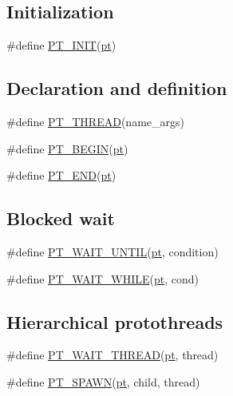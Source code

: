 \subsection*{Initialization}
\begin{DoxyCompactItemize}
\item 
\#define \hyperlink{group__pt_gae6bae7dc0225468c8a5ac269df549892}{P\+T\+\_\+\+I\+N\+I\+T}(\hyperlink{structpt}{pt})
\end{DoxyCompactItemize}
\subsection*{Declaration and definition}
\begin{DoxyCompactItemize}
\item 
\#define \hyperlink{group__pt_ga3d4c8bd4aada659eb34f5d2ffd3e7901}{P\+T\+\_\+\+T\+H\+R\+E\+A\+D}(name\+\_\+args)
\item 
\#define \hyperlink{group__pt_ga2ffbb9e554e08a343ae2f9de4bedfdfc}{P\+T\+\_\+\+B\+E\+G\+I\+N}(\hyperlink{structpt}{pt})
\item 
\#define \hyperlink{group__pt_ga7b04a0035bef29d905496c23bae066d2}{P\+T\+\_\+\+E\+N\+D}(\hyperlink{structpt}{pt})
\end{DoxyCompactItemize}
\subsection*{Blocked wait}
\begin{DoxyCompactItemize}
\item 
\#define \hyperlink{group__pt_ga99e43010ec61327164466aa2d902de45}{P\+T\+\_\+\+W\+A\+I\+T\+\_\+\+U\+N\+T\+I\+L}(\hyperlink{structpt}{pt}, condition)
\item 
\#define \hyperlink{group__pt_gaad14bbbf092b90aa0a5a4f9169504a8d}{P\+T\+\_\+\+W\+A\+I\+T\+\_\+\+W\+H\+I\+L\+E}(\hyperlink{structpt}{pt}, cond)
\end{DoxyCompactItemize}
\subsection*{Hierarchical protothreads}
\begin{DoxyCompactItemize}
\item 
\#define \hyperlink{group__pt_ga2f8f70c30b9ee08a103fbd69a4365c4c}{P\+T\+\_\+\+W\+A\+I\+T\+\_\+\+T\+H\+R\+E\+A\+D}(\hyperlink{structpt}{pt}, thread)
\item 
\#define \hyperlink{group__pt_ga9e97a0b4d5cc7764d8e19758f5da53ae}{P\+T\+\_\+\+S\+P\+A\+W\+N}(\hyperlink{structpt}{pt}, child, thread)
\end{DoxyCompactItemize}
